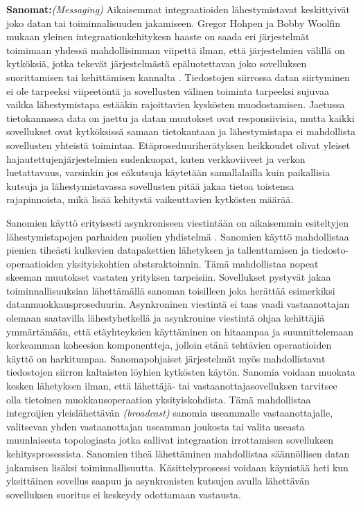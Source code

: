 \textbf{Sanomat:}\textit{(Messaging)} Aikaisemmat integraatioiden lähestymistavat keskittyivät joko datan tai toiminnalisuuden jakamiseen. Gregor Hohpen ja Bobby Woolfin mukaan yleinen integraationkehitykesn haaste on saada eri järjestelmät toimimaan yhdessä mahdollisimman viipettä ilman, että järjestelmien välillä on kytköksiä, jotka tekevät järjestelmästä epäluotettavan joko sovelluksen suorittamisen tai kehittämisen kannalta \citep[sivu~72]{Hohpe2004}. Tiedostojen siirrossa datan siirtyminen ei ole tarpeeksi viipeetöntä ja sovellusten välinen toiminta tarpeeksi sujuvaa vaikka lähestymistapa estääkin rajoittavien kyskösten muodostamisen. Jaetussa tietokannassa data on jaettu ja datan muutokset ovat responsiivisia, mutta kaikki sovellukset ovat kytköksissä samaan tietokantaan ja lähestymistapa ei mahdollista sovellusten yhteistä toimintaa.
Etäproseduuriherätyksen heikkoudet olivat yleiset hajautettujenjärjestelmien sudenkuopat, kuten verkkoviiveet ja verkon luetattavuus, varsinkin jos eäkutsuja käytetään samallalailla kuin paikallisia kutsuja ja lähestymistavassa sovellusten pitää jakaa tietoa toistensa rajapinnoista, mikä lisää kehitystä vaikeuttavien kytkösten määrää.

Sanomien käyttö erityisesti asynkroniseen viestintään on aikaisemmin esiteltyjen lähestymistapojen parhaiden puolien yhdistelmä \citep[sivu~73]{Hohpe2004}.
Sanomien käyttö mahdollistaa pienien tiheästi kulkevien datapakettien lähetyksen ja tallenttamisen ja tiedosto-operaatioiden yksityiskohtien abstsraktoinnin. Tämä mahdollistaa nopeat skeeman muutokset vastaten yrityksen tarpeisiin.
Sovellukset pystyvät jakaa toiminnallisuuksian lähettämällä sanoman toisilleen joka herättää esimerkiksi datanmuokkausproseduurin. Asynkroninen viestintä ei taas vaadi vastaanottajan olemaan saatavilla lähestyhetkellä ja asynkronine viestintä ohjaa kehittäjiä ymmärtämään, että etäyhteyksien käyttäminen on hitaampaa ja suunnittelemaan korkeamman koheesion komponentteja, jolloin etänä tehtävien operaatioiden käyttö on harkitumpaa.
Sanomapohjaiset järjestelmät myös mahdollistavat tiedostojen siirron kaltaisten löyhien kytkösten käytön. Sanomia voidaan muokata kesken lähetyksen ilman, että lähettäjä- tai vastaanottajasovelluksen tarvitsee olla tietoinen muokkausoperaation yksityiskohdista. Tämä mahdollistaa integroijien yleislähettävän \textit{(broadcast)} sanomia useammalle vastaanottajalle, valitsevan yhden vastaanottajan useamman joukosta tai valita useasta muunlaisesta topologiasta jotka sallivat integraation irrottamisen sovelluksen kehitysprosessista. 
Sanomien tiheä lähettäminen mahdollistaa säännöllisen datan jakamisen lisäksi toiminnallisuutta. Käsittelyprosessi voidaan käynistää heti kun yksittäinen sovellus saapuu ja asynkronisten kutsujen avulla lähettävän sovelluksen suoritus ei keskeydy odottamaan vastausta.


